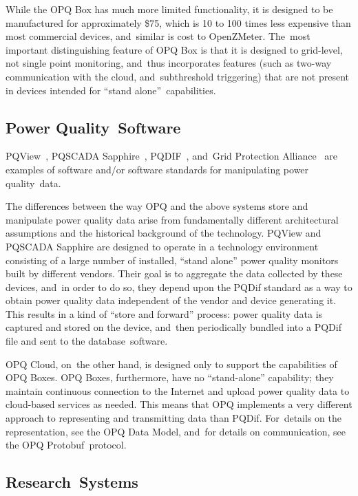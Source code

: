 \documentclass[energies,article,accept,moreauthors,pdftex]{Definitions/mdpi}
\begin{document}
While the OPQ Box has much more limited functionality, it is designed to be manufactured for approximately \$75, which is 10 to 100 times less expensive than most commercial devices, and~similar is cost to OpenZMeter. The~most important distinguishing feature of OPQ Box is that it is designed to grid-level, not single point monitoring, and~thus incorporates features (such as two-way communication with the cloud, and~subthreshold triggering) that are not present in devices intended for ``stand alone''~capabilities.

\subsection{Power Quality~Software}
\label{sec:commercial-pq-software}

PQView~\cite{electrotek_concepts_pqview_2020}, PQSCADA Sapphire~\cite{elspec_ltd_pqscada_2016}, PQDIF~\cite{sabin_ieee_2020}, and~Grid Protection Alliance~\cite{grid_protection_alliance_grid_2020} are examples of software and/or software standards for manipulating power quality~data.

The differences between the way OPQ and the above systems store and manipulate power quality data arise from fundamentally different architectural assumptions and the historical background of the technology. PQView and PQSCADA Sapphire are designed to operate in a technology environment consisting of a large number of installed, “stand alone” power quality monitors built by different vendors. Their goal is to aggregate the data collected by these devices, and~in order to do so, they depend upon the PQDif standard as a way to obtain power quality data independent of the vendor and device generating it. This results in a kind of “store and forward” process: power quality data is captured and stored on the device, and~then periodically bundled into a PQDif file and sent to the database~software.

OPQ Cloud, on~the other hand, is designed only to support the capabilities of OPQ Boxes. OPQ Boxes, furthermore, have no “stand-alone” capability; they maintain continuous connection to the Internet and upload power quality data to cloud-based services as needed. This means that OPQ implements a very different approach to representing and transmitting data than PQDif. For~details on the representation, see the OPQ Data Model, and~for details on communication, see the OPQ Protobuf~protocol.

\subsection{Research~Systems}
\end{document}
